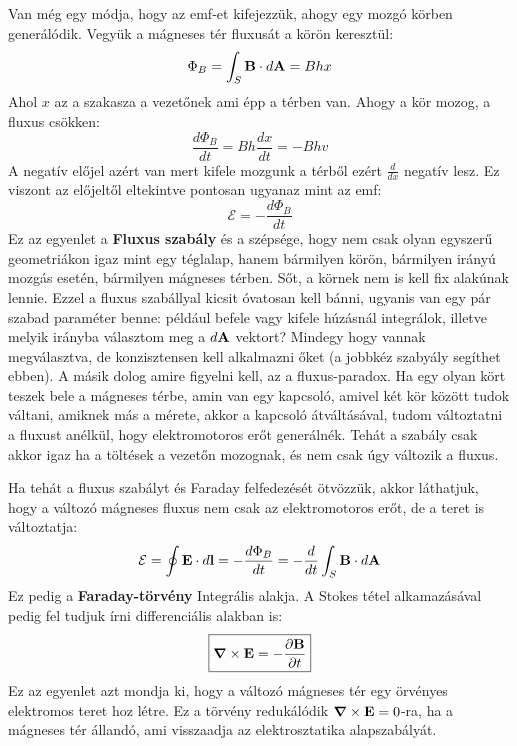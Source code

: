 \documentclass[a4paper,12pt]{article}
\begin{document}
Van még egy módja, hogy az emf-et kifejezzük, ahogy egy mozgó körben generálódik. Vegyük a mágneses tér fluxusát a körön keresztül:
\begin{equation}
    \Phi_B = \int_S \bold{B} \cdot d\bold{A} = B hx
\end{equation}
Ahol $x$ az a szakasza a vezetőnek ami épp a térben van. Ahogy a kör mozog, a fluxus csökken:
\begin{equation}
    \frac{d\Phi_B}{dt} = B h \frac{dx}{dt} = - B h v
\end{equation}
A negatív előjel azért van mert kifele mozgunk a térből ezért $\frac{d}{dx}$ negatív lesz. Ez viszont az előjeltől eltekintve pontosan ugyanaz mint az emf:
\begin{equation}
    \boxed{\mathcal{E} = - \frac{d\Phi_B}{dt}}
\end{equation}
Ez az egyenlet a \textbf{Fluxus szabály} és a szépsége, hogy nem csak olyan egyszerű geometriákon igaz mint egy téglalap, hanem bármilyen körön, bármilyen irányú mozgás esetén, bármilyen mágneses térben. Sőt, a körnek nem is kell fix alakúnak lennie.
Ezzel a fluxus szabállyal kicsit óvatosan kell bánni, ugyanis van egy pár szabad paraméter benne: például befele vagy kifele húzásnál integrálok, illetve melyik irányba választom meg a $d\bold{A}$ vektort? Mindegy hogy vannak megválasztva, de konzisztensen kell alkalmazni őket (a jobbkéz szabyály segíthet ebben).
A másik dolog amire figyelni kell, az a fluxus-paradox. Ha egy olyan kört teszek bele a mágneses térbe, amin van egy kapcsoló, amivel két kör között tudok váltani, amiknek más a mérete, akkor a kapcsoló átváltásával,
tudom változtatni a fluxust anélkül, hogy elektromotoros erőt generálnék. Tehát a szabály csak akkor igaz ha a töltések a vezetőn mozognak, és nem csak úgy változik a fluxus.

Ha tehát a fluxus szabályt és Faraday felfedezését ötvözzük, akkor láthatjuk, hogy a változó mágneses fluxus nem csak az elektromotoros erőt, de a teret is változtatja:
\begin{equation}
    \mathcal{E} = \oint \bold{E} \cdot d\bold{l} = - \frac{d\Phi_B}{dt} = - \frac{d}{dt} \int_S \bold{B} \cdot d\bold{A}
\end{equation}
Ez pedig a \textbf{Faraday-törvény} Integrális alakja. A Stokes tétel alkamazásával pedig fel tudjuk írni differenciális alakban is:
\begin{equation}
    \boxed{\boldsymbol{\nabla} \times \bold{E} = - \frac{\partial \bold{B}}{\partial t}}
\end{equation}
Ez az egyenlet azt mondja ki, hogy a változó mágneses tér egy örvényes elektromos teret hoz létre. 
Ez a törvény redukálódik $\boldsymbol{\nabla} \times \bold{E} = 0$-ra, ha a mágneses tér állandó, ami visszaadja az elektrosztatika alapszabályát.
\end{document}
